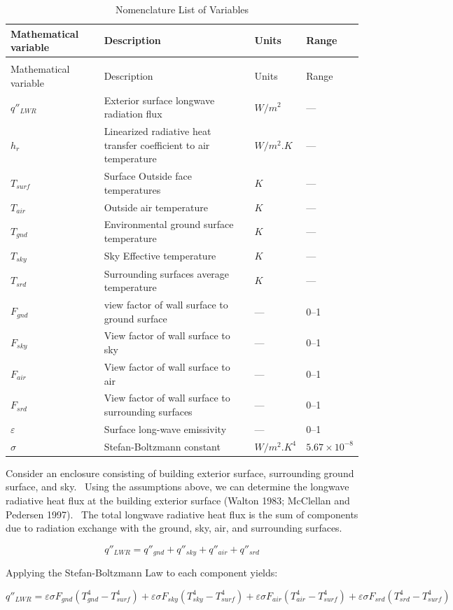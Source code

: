\begin{longtable}[c]{p{1.0in}p{3.0in}p{1.0in}p{1.0in}}

\caption{Nomenclature List of Variables \label{table:nomenclature-list-of-variables}} \tabularnewline
\toprule
Mathematical variable & Description & Units & Range \tabularnewline
\midrule
\endfirsthead

\caption[]{Nomenclature List of Variables} \tabularnewline
\toprule
Mathematical variable & Description & Units & Range \tabularnewline
\midrule
\endhead

$q''_{LWR}$ & Exterior surface longwave radiation flux & $W/m^2$ & --- \tabularnewline
$h_r$ & Linearized radiative heat transfer coefficient to air temperature & $W/m^2.K$ & --- \tabularnewline
$T_{surf}$ & Surface Outside face temperatures & $K$ & --- \tabularnewline
$T_{air}$ & Outside air temperature & $K$ & --- \tabularnewline
$T_{gnd}$ & Environmental ground surface temperature & $K$ & --- \tabularnewline
$T_{sky}$ & Sky Effective temperature & $K$ & --- \tabularnewline
$T_{srd}$ & Surrounding surfaces average temperature & $K$ & --- \tabularnewline
$F_{gnd}$ & view factor of wall surface to ground surface & --- & 0--1 \tabularnewline
$F_{sky}$ & View factor of wall surface to sky & --- & 0--1 \tabularnewline
$F_{air}$ & View factor of wall surface to air & --- & 0--1 \tabularnewline
$F_{srd}$ & View factor of wall surface to surrounding surfaces & --- & 0--1 \tabularnewline
$\varepsilon$ & Surface long-wave emissivity & --- & 0--1 \tabularnewline
$\sigma$ & Stefan-Boltzmann constant & $W/m^2.K^4$ & $5.67 \times 10^{-8}$ \tabularnewline
\bottomrule
\end{longtable}

Consider an enclosure consisting of building exterior surface, surrounding ground surface, and sky.~ Using the assumptions above, we can determine the longwave radiative heat flux at the building exterior surface (Walton 1983; McClellan and Pedersen 1997).~ The total longwave radiative heat flux is the sum of components due to radiation exchange with the ground, sky, air, and surrounding surfaces.

\begin{equation}
{q''_{LWR}} = {q''_{gnd}} + {q''_{sky}} + {q''_{air}} + {q''_{srd}}
\end{equation}

Applying the Stefan-Boltzmann Law to each component yields:

\begin{equation}
{q''_{LWR}} = \varepsilon \sigma {F_{gnd}}(T_{gnd}^4 - T_{surf}^4) + \varepsilon \sigma {F_{sky}}(T_{sky}^4 - T_{surf}^4) + \varepsilon \sigma {F_{air}}(T_{air}^4 - T_{surf}^4)  + \varepsilon \sigma {F_{srd}}(T_{srd}^4 - T_{surf}^4)
\end{equation}

